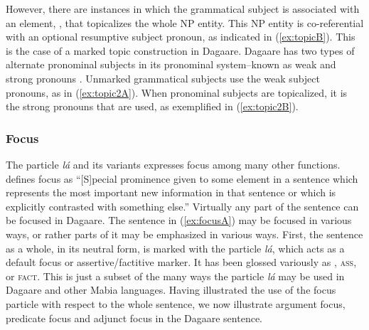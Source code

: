 \ea {}
\z\z


\ea {}
\z\z 

However, there are instances in which the grammatical subject is associated with an element,
\textsc{{\TOP}}, that topicalizes the whole NP entity. This NP entity is co-referential with an optional
resumptive subject pronoun, as indicated in (\ref{ex:topicB}). This is the case of a marked topic
construction in Dagaare. Dagaare has two types of alternate pronominal subjects in its
pronominal system--known as weak and strong pronouns \citep{Bodomo1997}. Unmarked
grammatical subjects use the weak subject pronouns, as in (\ref{ex:topic2A}). When pronominal subjects
are topicalized, it is the strong pronouns that are used, as exemplified in (\ref{ex:topic2B}).\bigskip

\subsubsection{ Focus}

The particle \textit{lá} and its variants expresses focus  among many other functions. \citet[105]{Trask1993} defines focus as ``[S]pecial prominence given to some element in a sentence
which represents the most important new information in that sentence or which is explicitly
contrasted with something else.'' Virtually any part of the sentence can be focused in
Dagaare. The sentence in (\ref{ex:focusA}) may be focused in various ways, or rather parts of it may be
emphasized in various ways. First, the sentence as a whole, in its neutral form, is marked with
the particle \textit{lá}, which acts as a default focus or assertive/factitive marker. It has 
been glossed variously as \textsc{{\FOC}}, \textsc{ass}, or \textsc{fact}. This is just a subset of the many ways the
particle \textit{lá} may be used in Dagaare
\citep{Bodomo1997, Bodomo1997Pathfinders,  Dakubu1998} and
other Mabia languages. Having illustrated the use of the focus particle with respect to the
whole sentence, we now illustrate argument focus, predicate focus and adjunct focus in the
Dagaare sentence.



